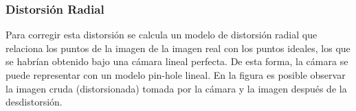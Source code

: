 \begin{frame}
    \frametitle{Distorsión Radial}
    
    Para corregir esta distorsión se calcula un modelo de distorsión radial que relaciona los puntos de la imagen de la imagen real con los puntos ideales, los que se habrían obtenido bajo una cámara lineal perfecta. De esta forma, la cámara se puede representar con un modelo pin-hole lineal. En la figura es posible observar la imagen cruda (distorsionada) tomada por la cámara y la imagen después de la desdistorsión.
    
    \begin{figure}[!h]
        \centering
    \end{figure}
    
\end{frame}


    
    
    
